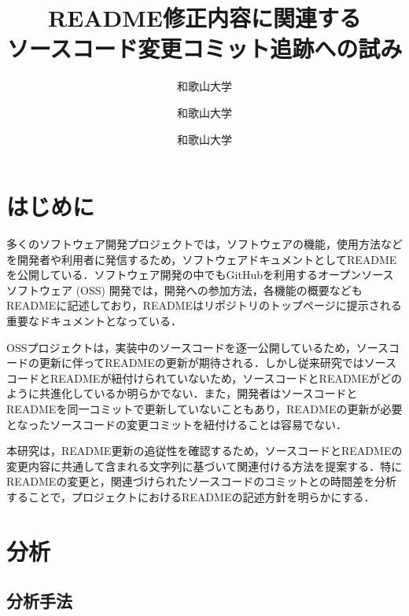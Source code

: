 \documentclass[uplatex,dvipdfmx,a4paper,twocolumn,base=11pt,jbase=11pt,ja=standard]{bxjsarticle}  %
\title{README修正内容に関連する\\ソースコード変更コミット追跡への試み}{Toward tracking source code change commits related to README revision}
\author{和歌山大学}{白﨑 優奈}{Shirasaki Yuna, Wakayama University}
\author{和歌山大学}{伊原 彰紀}{Akinori Ihara, Wakayama University}
\author{和歌山大学}{石岡 直樹}{Naoki Ishioka, Wakayama University}
\newcommand{\todo}[1]{\colorbox{yellow}{{\bf TODO}:}{\color{red} {\textbf{[#1]}}}}
\begin{document}
\maketitle


\section{はじめに}


多くのソフトウェア開発プロジェクトでは，ソフトウェアの機能，使用方法などを開発者や利用者に発信するため，ソフトウェアドキュメントとしてREADMEを公開している．ソフトウェア開発の中でもGitHubを利用するオープンソースソフトウェア (OSS) 開発では，開発への参加方法，各機能の概要などもREADMEに記述しており，READMEはリポジトリのトップページに提示される重要なドキュメントとなっている．

OSSプロジェクトは，実装中のソースコードを逐一公開しているため，ソースコードの更新に伴ってREADMEの更新が期待される．しかし従来研究\cite{bib1}\cite{bib2}ではソースコードとREADMEが紐付けられていないため，ソースコードとREADMEがどのように共進化しているか明らかでない．また，開発者はソースコードとREADMEを同一コミットで更新していないこともあり，READMEの更新が必要となったソースコードの変更コミットを紐付けることは容易でない．

本研究は，README更新の追従性を確認するため，ソースコードとREADMEの変更内容に共通して含まれる文字列に基づいて関連付ける方法を提案する．特にREADMEの変更と，関連づけられたソースコードのコミットとの時間差を分析することで，プロジェクトにおけるREADMEの記述方針を明らかにする．


\section{分析}

\subsection{分析手法}
\end{document}
